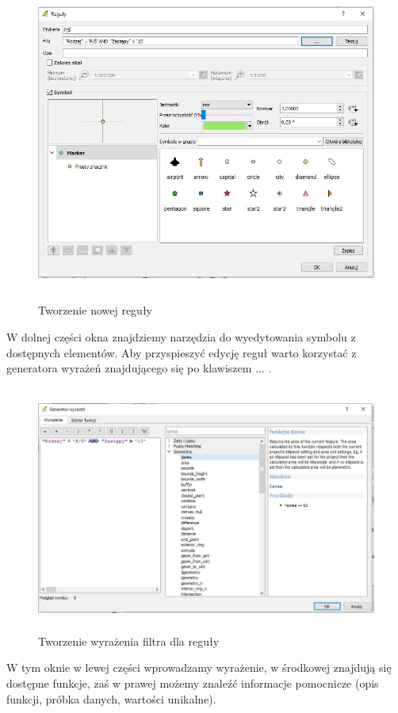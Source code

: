 \documentclass[12pt,a4paper]{book}
\begin{document}
\begin{center}
\begin{figure}
\includegraphics[width=13cm,height=10.499cm]{007-nowa-regula.jpg}
\caption{Tworzenie nowej reguły}
\end{figure}
\end{center}
W dolnej części okna znajdziemy narzędzia do wyedytowania symbolu z dostępnych elementów. Aby przyspieszyć edycję reguł warto korzystać z generatora wyrażeń znajdującego się po klawiszem  ... .

\begin{center}
\begin{figure}
\includegraphics[width=13cm,height=8.107cm]{007-filtr-reguly.jpg}
\caption{Tworzenie wyrażenia filtra dla reguły}
\end{figure}
\end{center}
W tym oknie w lewej części wprowadzamy wyrażenie, w środkowej znajdują się dostępne funkcje, zaś w prawej możemy znaleźć informacje pomocnicze (opis funkcji, próbka danych, wartości unikalne).
\end{document}
